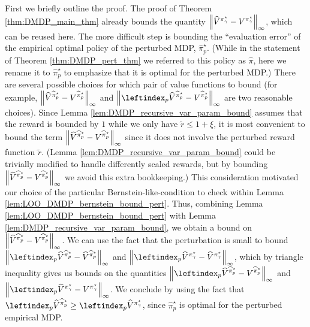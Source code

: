 \documentclass{article}
\theoremstyle{plain}
\theoremstyle{plain}
\theoremstyle{remark}
\theoremstyle{plain}
\theoremstyle{plain}
\newcommand{\Vhat}{\widehat{V}}
\newcommand{\pistar}{\pi^\star}
\newcommand{\pihat}{\widehat{\pi}}
\newcommand{\Vhatpert}{\leftindex_p{\Vhat}}
\newcommand{\pihatpert}{\pihat^\star_p}
\begin{document}
First we briefly outline the proof. The proof of Theorem \ref{thm:DMDP_main_thm} already bounds the quantity $\infnorm{ \Vhat^{\pistar_\gamma} - V^{\pistar_\gamma}}$, which can be reused here. The more difficult step is bounding the ``evaluation error'' of the empirical optimal policy of the perturbed MDP, $\pihatpert$. (While in the statement of Theorem \ref{thm:DMDP_pert_thm} we referred to this policy as $\pihat$, here we rename it to $\pihatpert$ to emphasize that it is optimal for the perturbed MDP.) There are several possible choices for which pair of value functions to bound (for example, $\infnorm{\Vhat^{\pihatpert}  - V^{\pihatpert}}$ and $\infnorm{\Vhatpert^{\pihatpert} - V^{\pihatpert}} $ are two reasonable choices). Since Lemma \ref{lem:DMDP_recursive_var_param_bound} assumes that the reward is bounded by $1$ while we only have $\widetilde{r} \leq 1 + \xi$, it is most convenient to bound the term $\infnorm{\Vhat^{\pihatpert}  - V^{\pihatpert}}$ since it does not involve the perturbed reward function $\widetilde{r}$. (Lemma \ref{lem:DMDP_recursive_var_param_bound} could be trivially modified to handle differently scaled rewards, but by bounding $\infnorm{\Vhat^{\pihatpert}  - V^{\pihatpert}}$ we avoid this extra bookkeeping.) This consideration motivated our choice of the particular Bernstein-like-condition to check within Lemma \ref{lem:LOO_DMDP_bernstein_bound_pert}. Thus, combining Lemma \ref{lem:LOO_DMDP_bernstein_bound_pert} with Lemma \ref{lem:DMDP_recursive_var_param_bound}, we obtain a bound on $\infnorm{\Vhat^{\pihatpert}  - V^{\pihatpert}}$. We can use the fact that the perturbation is small to bound $\infnorm{\Vhatpert^{\pihatpert} - \Vhat^{\pihatpert}}$ and $\infnorm{\Vhatpert^{\pistar_\gamma} - \Vhat^{\pistar_\gamma}}$, which by triangle inequality gives us bounds on the quantities $\infnorm{\Vhatpert^{\pihatpert} - V^{\pihatpert}}$ and $\infnorm{ \Vhatpert^{\pistar_\gamma} - V^{\pistar_\gamma}}$. We conclude by using the fact that $\Vhatpert^{\pihatpert} \geq \Vhatpert^{\pistar_\gamma}$, since $\pihatpert$ is optimal for the perturbed empirical MDP.
\end{document}
